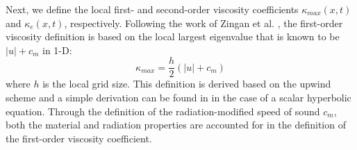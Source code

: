 \documentclass[review]{elsarticle}
\begin{document}
Next, we define the local first- and second-order viscosity coefficients $\kappa_{max}(x,t)$ and $\kappa_e(x,t)$, respectively. Following the work of Zingan et al. \cite{valentin}, the first-order viscosity definition is based on the local largest eigenvalue that is known to be $|u| + c_m$ in 1-D:
\begin{equation}
\label{eq:equation8}
\kappa_{max} = \frac{h}{2} \left( |u| + c_m \right)
\end{equation}  
where $h$ is the local grid size. This definition is derived based on the upwind scheme and a simple derivation can be found in \cite{jlg1} in the case of a scalar hyperbolic equation. Through the definition of the radiation-modified speed of sound $c_m$, both the material and radiation properties are accounted for in the definition of the first-order viscosity coefficient.
\end{document}

